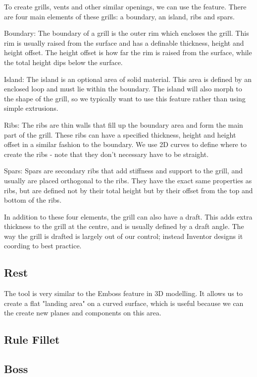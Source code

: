 To create grills, vents and other similar openings, we can use the  feature. There are four main elements of these grills: a boundary, an island, ribs and spars.

Boundary:
The boundary of a grill is the outer rim which encloses the grill. This rim is usually raised from the surface and has a definable thickness, height and height offset. The height offset is how far the rim is raised from the surface, while the total height dips below the surface.

Island:
The island is an optional area of solid material. This area is defined by an enclosed loop and must lie within the boundary. The island will also morph to the shape of the grill, so we typically want to use this feature rather than using simple extrusions.

Ribs:
The ribs are thin walls that fill up the boundary area and form the main part of the grill. These ribs can have a specified thickness, height and height offset in a similar fashion to the boundary. We use 2D curves to define where to create the ribs - note that they don't necessary have to be straight.

Spars:
Spars are secondary ribs that add stiffness and support to the grill, and usually are placed orthogonal to the ribs. They have the exact same properties as ribs, but are defined not by their total height but by their offset from the top and bottom of the ribs.

In addition to these four elements, the grill can also have a draft. This adds extra thickness to the grill at the centre, and is usually defined by a draft angle. The way the grill is drafted is largely out of our control; instead Inventor designs it coording to best practice. 

\subsection{Rest}
The  tool is very similar to the Emboss feature in 3D modelling. It allows us to create a flat "landing area" on a curved surface, which is useful because we can the create new planes and components on this area.

\subsection{Rule Fillet}

\subsection{Boss}

